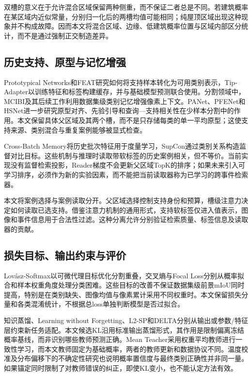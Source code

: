 \documentclass[UTF8,a4paper,zihao=-4,fontset=none]{ctexart}
\begin{document}
双槽的意义在于允许混合区域保留两种侧重，而不保证二者总是不同。若建筑概率在某区域内近似常量，分别归一化后的两槽均值可能相同；纯屋顶区域出现这种现象并不构成故障。因而本文将混合区域、边缘、低建筑概率位置与区域内部区分统计，而不是通过强制正交制造差异。

\FloatBarrier

\subsection{历史支持、原型与记忆增强}

Prototypical Networks和FEAT研究如何将支持样本转化为可用类别表示，Tip-Adapter以训练特征和标签构建缓存，并与基础模型预测联合使用\cite{ref29,ref30,ref11}。分割领域中，MCIBI及其后续工作利用数据集级类别记忆增强像素上下文\cite{ref10,ref31}。PANet、PFENet和HSNet进一步研究原型对齐、先验引导和查询—支持相关性在少样本分割中的作用\cite{ref32,ref33,ref34}。本文保留具体父区域及其两个槽，而不是只存储每类的单一平均原型；这使支持来源、类别混合与重复案例能够被显式检查。

Cross-Batch Memory将历史批次特征用于度量学习，SupCon通过类别关系构造监督对比目标\cite{ref35,ref36}。这些机制与推理时读取带软标签的历史案例相关，但不等价。当前实现没有监督检索投影，Reader梯度不会更新父区域TopK的排序；如果未来引入可学习排序，必须作为新的实验因素，而不能把当前读取器称为已学习的跨事件检索器。

本文将案例选择与案例读取分开。父区域选择控制支持身份和预算，槽级注意力决定如何读取已选支持。借鉴注意力机制的通用形式\cite{ref37}，支持软标签仅进入值表示，图像和事件信息用于合法性过滤。这种分离允许分别验证检索质量、标签信息及读取器的贡献。

\FloatBarrier

\subsection{损失目标、输出约束与评价}

Lovász-Softmax以可微代理目标优化分割重叠，交叉熵与Focal Loss分别从概率拟合和样本权重角度处理分类困难\cite{ref38,ref39}。这些目标的改善不保证数据集级前景mIoU同时提高，特别是在类别缺失、图像均值与像素累计采用不同权重时。本文保留损失分量和各类混淆统计，不根据总loss单独判断模型是否过拟合。

知识蒸馏、Learning without Forgetting、L2-SP和DELTA分别从输出或参数/特征层约束新任务适配\cite{ref40,ref41,ref42,ref43}。本文候选KL沿用标准输出蒸馏形式，其作用是限制偏离冻结概率基线，而非识别哪些教师预测正确。Mean Teacher采用权重平均教师进行一致性学习，而本文教师固定为基础概率，两者的教师更新和数据协议不同\cite{ref44}。温度校准及分布偏移下的不确定性研究也说明概率置信度与最终类别正确性并非同一量\cite{ref45,ref46}。如果锚定同时限制了对教师错误的纠正，即使KL变小，也不能认定方法有效。
\end{document}
